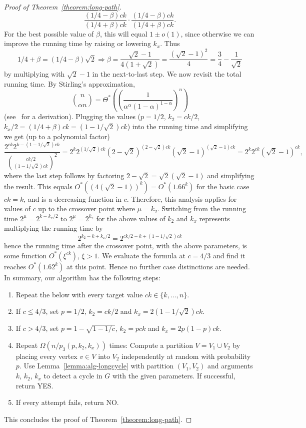 \documentclass[10pt,a4paper]{article}
\begin{document}
\begin{proof}[Proof of Theorem~\ref{theorem:long-path}]
\[{      \frac{(1/4-\beta)ck}{(1/4+\beta)ck} \cdot
      \frac{(1/4-\beta)ck}{(1/4+\beta)ck}}.
  \]
  For the best possible value of $\beta$, this will equal $1 \pm o(1)$,  
  since otherwise we can improve the running time by raising or
  lowering $k_x$. Thus
  \[
    1/4 + \beta = (1/4-\beta)\sqrt{2} \Rightarrow
    \beta = \frac{\sqrt{2}-1}{4(1+\sqrt{2})}  =   \frac{(\sqrt{2}-1)^2}{4} 
    = \frac{3}{4} - \frac{1}{\sqrt{2}}
  \]
  by multiplying with $\sqrt{2}-1$ in the next-to-last step.
  We now revisit the total running time. By Stirling's approximation,
  \[
    \binom{n}{\alpha n} 
    = \Theta^*\left(\left( \frac{1}{\alpha^{\alpha} (1-\alpha)^{1-\alpha}} \right)^n\right)
  \]
  (see~\cite{BjorklundHKK17narrow} for a derivation).
  Plugging the values ($p=1/2$, $k_2=ck/2$, $k_x/2=(1/4+\beta)ck=(1-1/\sqrt{2})ck$)
  into the running time and simplifying we get (up to a polynomial factor)
  \[
    \frac{2^{ck} 2^{k-(1-1/\sqrt{2})ck}}
    {\binom{ck/2}{(1-1/\sqrt{2})ck}^2}
    =
    2^k2^{(1/\sqrt{2})ck}(2-\sqrt{2})^{(2-\sqrt{2})ck} (\sqrt{2}-1)^{(\sqrt{2}-1)ck}
    =  2^k2^{ck} (\sqrt{2}-1)^{ck},
  \]
  where the last step follows by factoring $2-\sqrt{2} = \sqrt{2}(\sqrt{2}-1)$ and
  simplifying the result.
  This equals $O^*((4(\sqrt{2}-1))^k)=O^*(1.66^k)$ for the basic case $ck=k$,
  and is a decreasing function in $c$. Therefore, this analysis
  applies for values of $c$ up to the crossover point where $\mu=k_2$. 
  Switching from the running time $2^\mu=2^{k-k_x/2}$ to $2^\mu=2^{k_2}$
  for the above values of $k_2$ and $k_x$ 
  represents multiplying the running time by
  \[
    2^{k_2-k+k_x/2}=2^{ck/2-k+(1-1/\sqrt{2})ck}
  \]
  hence the running time after the crossover point, with the above
  parameters, is some function $O^*(\xi^{ck})$, $\xi>1$. We evaluate
  the formula at $c=4/3$ and find it reaches $O^*(1.62^k)$ at this point. 
  Hence no further case distinctions are needed. In summary, our
  algorithm has the following steps:
  \begin{enumerate}
  \item Repeat the below with every target value $ck \in \{k,\ldots,n\}$.
  \item If $c \leq 4/3$, set $p=1/2$, $k_2=ck/2$ and $k_x=2(1-1/\sqrt{2})ck$.
  \item If $c>4/3$, set $p = 1-\sqrt{1-1/c}$, $k_2=pck$ and $k_x=2p(1-p)ck$.
  \item Repeat $\Omega(n/p_3(p, k_2, k_x))$ times: Compute a partition $V=V_1 \cup V_2$ 
    by placing every vertex $v \in V$ into $V_2$ independently at
    random with probability $p$. Use Lemma~\ref{lemma:alg-longcycle}
    with partition $(V_1,V_2)$ and arguments $k$, $k_2$, $k_x$
    to detect a cycle in $G$ with the given parameters. If successful,
    return YES.
  \item If every attempt fails, return NO.
  \end{enumerate}  
  This concludes the proof of Theorem~\ref{theorem:long-path}.
\end{proof}
\end{document}
